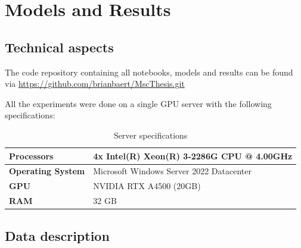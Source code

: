 \chapter{Models and Results}
\section{Technical aspects}
The code repository containing all notebooks, models and results can be found via \newline \url{https://github.com/brianbaert/MscThesis.git} 


All the experiments were done on a single GPU server with the following specifications:
\begin{table}[H]
\centering
\begin{tabular}{|l|l|}
\hline
\textbf{Processors} & 4x Intel(R) Xeon(R) 3-2286G CPU @ 4.00GHz \\
\hline
\textbf{Operating System} & Microsoft Windows Server 2022 Datacenter \\
\hline
\textbf{GPU} & NVIDIA RTX A4500 (20GB) \\
\hline
\textbf{RAM} & 32 GB \\
\hline
\end{tabular}
\label{tbl:specifications}
\caption{Server specifications}
\end{table}

\section{Data description}
\label{sec-DataDesc}
